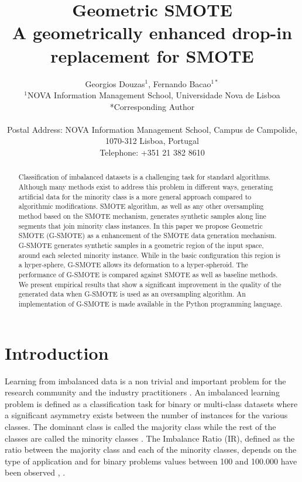 \documentclass[parskip=full]{scrartcl}
\title{Geometric SMOTE \\ \LARGE{A geometrically enhanced drop-in replacement for SMOTE}}
\author{
	Georgios Douzas\(^{1}\), Fernando Bacao\(^{1*}\)
	\\
	\small{\(^{1}\)NOVA Information Management School, Universidade Nova de Lisboa}
	\\
	\small{*Corresponding Author}
	\\
	\\
	\small{Postal Address: NOVA Information Management School, Campus de Campolide, 1070-312 Lisboa, Portugal}
	\\
	\small{Telephone: +351 21 382 8610}
}
\date{}
\begin{document}
\maketitle

\begin{abstract}
Classification of imbalanced datasets is a challenging task for standard
algorithms. Although many methods exist to address this problem in different
ways, generating artificial data for the minority class is a more general
approach compared to algorithmic modifications. SMOTE algorithm, as well as any
other oversampling method based on the SMOTE mechanism, generates synthetic
samples along line segments that join minority class instances. In this paper we
propose Geometric SMOTE (G-SMOTE) as a enhancement of the SMOTE data generation
mechanism. G-SMOTE generates synthetic samples in a geometric region of the
input space, around each selected minority instance. While in the basic
configuration this region is a hyper-sphere, G-SMOTE allows its deformation to a
hyper-spheroid. The performance of G-SMOTE is compared against SMOTE as well as
baseline methods. We present empirical results that show a significant
improvement in the quality of the generated data when G-SMOTE is used as an
oversampling algorithm. An implementation of G-SMOTE is made available in the
Python programming language.
\end{abstract}

\section{Introduction}
Learning from imbalanced data is a non trivial and important problem for the
research community and the industry practitioners \cite{Chawla2003}. An
imbalanced learning problem is defined as a classification task for binary or
multi-class datasets where a significant asymmetry exists between the number of
instances for the various classes. The dominant class is called the majority
class while the rest of the classes are called the minority classes
\cite{Chawla2003}. The Imbalance Ratio (IR), defined as the ratio between the
majority class and each of the minority classes, depends on the type of
application and for binary problems values between 100 and 100.000 have been
observed \cite{Chawla2002}, \cite{Barua2014}.
\end{document}
